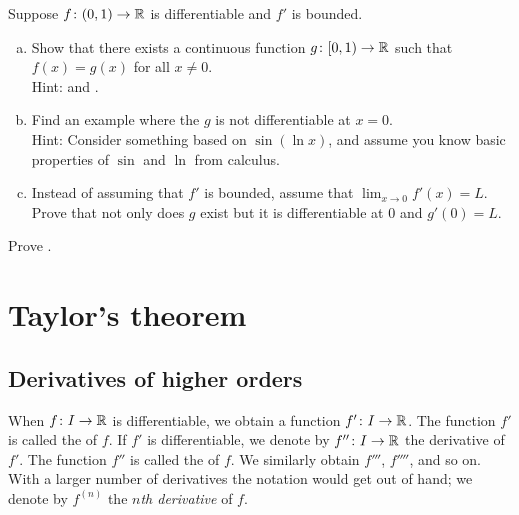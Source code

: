 \begin{exercise} \label{exercise:extendboundedder}
Suppose $f \colon (0,1) \to {\mathbb{R}}$ is differentiable and $f'$
is bounded.
\begin{enumerate}[a)]
\item
Show that there exists a continuous function $g \colon [0,1) \to {\mathbb{R}}$
such that $f(x) = g(x)$ for all $x \not= 0$.\\
Hint:  and
.
\item
Find an example where the $g$ is not differentiable at $x=0$.
\\
Hint: Consider something based on $\sin(\ln x)$,
and assume you know basic properties of
$\sin$ and $\ln$ from calculus.
\item
Instead of assuming that $f'$ is bounded, assume that $\lim_{x \to 0} f'(x)
= L$.  Prove that not only does $g$ exist but it is differentiable at $0$
and $g'(0) = L$.
\end{enumerate}
\end{exercise}

\begin{exercise}
Prove .
\end{exercise}


\sectionnewpage
\section{Taylor's theorem}
\label{sec:taylor}


\subsection{Derivatives of higher orders}

When $f \colon I \to {\mathbb{R}}$ is differentiable, we obtain a function
$f' \colon I \to {\mathbb{R}}$.  The function
$f'$ is called the \emph{} of $f$.
If $f'$ is differentiable, we denote by
$f'' \colon I \to {\mathbb{R}}$ the derivative of $f'$.  The function $f''$
is called the \emph{} of $f$.
We similarly obtain
$f'''$, $f''''$, and so on.
With a larger number of derivatives
the notation would get out of hand; we denote
by $f^{(n)}$ the
\emph{$n$th derivative} of $f$.

